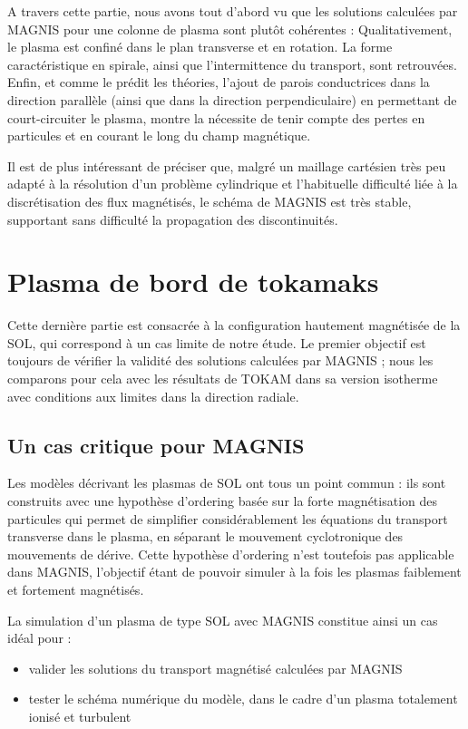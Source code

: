 \begin{refsection}
A travers cette partie, nous avons tout d'abord vu que 
les solutions calculées par MAGNIS pour une colonne de plasma
sont plutôt cohérentes : Qualitativement, le plasma est confiné dans le plan
transverse et en rotation. La forme caractéristique en spirale, ainsi que
l'intermittence du transport, sont retrouvées. Enfin, et comme le prédit les
théories, l'ajout de parois conductrices dans la direction parallèle (ainsi
que dans la direction perpendiculaire) en permettant de court-circuiter le
plasma, montre la nécessite de tenir compte des pertes en particules et en
courant le long du champ magnétique.

Il est de plus intéressant de préciser que, malgré un maillage cartésien très
peu adapté à la résolution d'un problème cylindrique et l'habituelle difficulté
liée à la discrétisation des flux magnétisés, le schéma de MAGNIS est très
stable, supportant sans difficulté la propagation des discontinuités.

\section{Plasma de bord de tokamaks}

Cette dernière partie est consacrée à la configuration hautement magnétisée
de la SOL, qui correspond à un cas limite de notre étude. Le premier objectif
est toujours de vérifier la validité des solutions calculées par MAGNIS ; 
nous les comparons pour cela avec les résultats de
TOKAM dans sa version isotherme avec conditions aux limites dans la direction
radiale.

\subsection{Un cas critique pour MAGNIS}
Les modèles décrivant les plasmas de SOL ont tous un
point commun :
ils sont construits avec une hypothèse d'ordering basée sur la forte magnétisation des
particules qui permet de simplifier considérablement les équations
du transport transverse dans le plasma, en séparant le mouvement cyclotronique
des mouvements de dérive.
Cette hypothèse d'ordering n'est
toutefois pas applicable dans MAGNIS, l'objectif étant de pouvoir simuler à la
fois les plasmas faiblement et fortement magnétisés. 

La simulation d'un plasma de type SOL avec MAGNIS constitue ainsi un cas idéal
pour :

\begin{itemize}
  \item valider les solutions du transport magnétisé calculées par MAGNIS
  \item	tester le schéma numérique du modèle, dans le cadre d'un plasma
  totalement ionisé et turbulent
  

\end{itemize}
\end{refsection}
